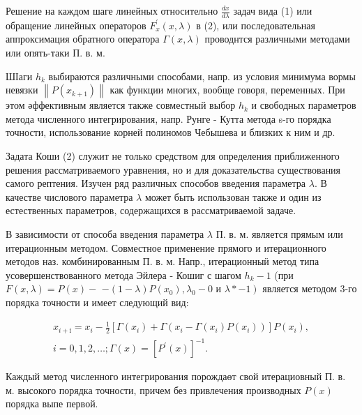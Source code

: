 \documentclass[10pt]{article}
\begin{document}
Решение на каждом шаге линейных относительно $\frac{d x}{d \lambda}$ задач вида (1) или обращение линейных операторов $F_{x}^{\prime}(x, \lambda)$ в (2), или последовательная аппроксимация обратного оператора $\Gamma(x, \lambda)$ проводнтся различными методами или опять-таки П. в. м.



ШІаги $h_{k}$ выбираются различными способами, напр. из условия минимума вормы невязки $\left\|P\left(x_{k+1}\right)\right\|$ как функции многих, вообще говоря, переменных. При этом әффективным является также совместный выбор $h_{k}$ и свободных параметров метода численного интегрирования, напр. Рунге - Кутта метода s-го порядка точности, использование корней полиномов Чебышева и близких к ним и др.



Задата Коши (2) служит не только средством для определения приближенного решения рассматриваемого уравнения, но и для доказательства существования самого рептения. Изучен ряд различных способов введения параметра $\lambda$. В качестве числового параметра $\lambda$ может быть использован также и один из естественных параметров, содержащихся в рассматриваемой задаче.



В зависимости от способа введения параметра $\lambda$ П. в. м. является прямым или итерационным методом. Совместное применение прямого и итерационного методов наз. комбинированным П. в. м. Напр., итерационныӥ метод типа усовершенствованного метода Эйлера - Кошиг с шагом $h_{k}-1$ (при $F(x, \lambda)=P(x)-$ $-(1-\lambda) P\left(x_{0}\right), \lambda_{0}-0$ и $\left.\lambda *-1\right)$ является методом 3-го порядка точности и имеет следующий вид:



\[

\begin{gathered}

x_{i+\mathrm{i}}=x_{i}-\frac{1}{2}\left[\Gamma\left(x_{i}\right)+\Gamma\left(x_{i}-\Gamma\left(x_{i}\right) P\left(x_{i}\right)\right)\right] P\left(x_{i}\right), \\

i=0,1,2, \ldots ; \Gamma(x)=\left[P^{\prime}(x)\right]^{-1} .

\end{gathered}

\]



Каждый метод численного интегрирования порождаөт свой итерациовный П. в. м. высокого порядка точности, причем без привлечения производных $P(x)$ порядка выпе первой.
\end{document}
